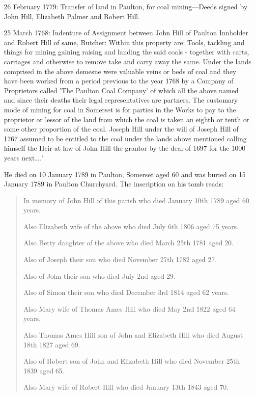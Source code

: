 26 February 1779: Transfer of land in Paulton, for coal mining---Deeds signed by John Hill, Elizabeth Palmer and Robert Hill.

25 March 1768: Indenture of Assignment between John Hill of Paulton Innholder and Robert Hill of same, Butcher:
Within this property are: Tools, tackling and things for mining gaining raising and landing the said coals - together with carts, carriages and otherwise to remove take and carry away the same.
Under the lands comprised in the above demesne were valuable veins or beds of coal and they have been worked from a period previous to the year 1768 by a Company of Proprietors called 'The Paulton Coal Company' of which all the above named and since their deaths their legal representatives are partners.
The customary mode of mining for coal in Somerset is for parties in the Works to pay to the proprietor or lessor of the land from which the coal is taken an eighth or tenth or some other proportion of the coal.
Joseph Hill under the will of Joseph Hill of 1767 assumed to be entitled to the coal under the lands above mentioned calling himself the Heir at law of John Hill the grantor by the deal of 1697 for the 1000 years next\dots."

He died on 10 January 1789 in Paulton, Somerset aged 60 and was buried on 15 January 1789 in Paulton Churchyard. The inscription on his tomb reads:

\begin{quotation}
In memory of John Hill of this parish who died January 10th 1789 aged 60 years.

Also Elizabeth wife of the above who died July 6th 1806 aged 75 years.

Also Betty daughter of the above who died March 25th 1781 aged 20.

Also of Joseph their son who died November 27th 1782 aged 27.

Also of John their son who died July 2nd aged 29.

Also of Simon their son who died December 3rd 1814 aged 62 years.

Also Mary wife of Thomas Ames Hill who died May 2nd 1822 aged 64 years.

Also Thomas Ames Hill son of John and Elizabeth Hill who died August 18th 1827 aged 69.

Also of Robert son of John and Elizabeth Hill who died November 25th 1839 aged 65.

Also Mary wife of Robert Hill who died January 13th 1843 aged 70.
\end{quotation}


